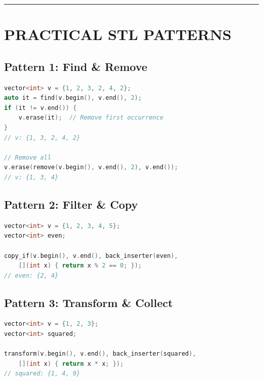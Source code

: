 \begin{center}\rule{0.5\linewidth}{0.5pt}\end{center}

\hypertarget{practical-stl-patterns}{%
\section{PRACTICAL STL PATTERNS}\label{practical-stl-patterns}}

\hypertarget{pattern-1-find-remove}{%
\subsection{Pattern 1: Find \& Remove}\label{pattern-1-find-remove}}

\begin{lstlisting}[language={C++}]
vector<int> v = {1, 2, 3, 2, 4, 2};
auto it = find(v.begin(), v.end(), 2);
if (it != v.end()) {
    v.erase(it);  // Remove first occurrence
}
// v: {1, 3, 2, 4, 2}

// Remove all
v.erase(remove(v.begin(), v.end(), 2), v.end());
// v: {1, 3, 4}
\end{lstlisting}

\hypertarget{pattern-2-filter-copy}{%
\subsection{Pattern 2: Filter \& Copy}\label{pattern-2-filter-copy}}

\begin{lstlisting}[language={C++}]
vector<int> v = {1, 2, 3, 4, 5};
vector<int> even;

copy_if(v.begin(), v.end(), back_inserter(even),
    [](int x) { return x % 2 == 0; });
// even: {2, 4}
\end{lstlisting}

\hypertarget{pattern-3-transform-collect}{%
\subsection{Pattern 3: Transform \&
Collect}\label{pattern-3-transform-collect}}

\begin{lstlisting}[language={C++}]
vector<int> v = {1, 2, 3};
vector<int> squared;

transform(v.begin(), v.end(), back_inserter(squared),
    [](int x) { return x * x; });
// squared: {1, 4, 9}
\end{lstlisting}

